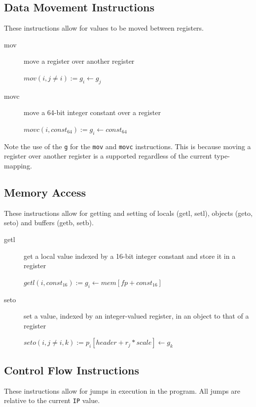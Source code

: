 \documentclass[english,a4paper,12pt]{report}
\begin{document}
\subsection{Data Movement Instructions}
These instructions allow for values to be moved between registers.

\begin{description}
	\item[mov] move a register over another register
	
	$mov(i, j \neq i) := g_{i} \longleftarrow g_{j} $ \\
	\item[movc] move a 64-bit integer constant over a register
	
	$movc(i, const_{64}):= g_{i} \longleftarrow const_{64} $ \\
\end{description}

Note the use of the \verb|g| for the \verb|mov| and \verb|movc|
instructions. This is because moving a register over another register
is a supported regardless of the current type-mapping.

\subsection{Memory Access}
These instructions allow for getting and setting of locals (getl,
setl), objects (geto, seto) and buffers (getb, setb).

\begin{description}
	\item[getl] get a local value indexed by a 16-bit integer 
	constant and store it in a register
	
	$getl(i, const_{16}):= g_{i} \longleftarrow mem[fp + const_{16}]$ 
	\\
	\item[seto] set a value, indexed by an integer-valued register, 
	in an
	object to that of a register
	
	$seto(i, j \neq i, k):= p_{i}[header + r_{j}*scale] 
	\longleftarrow g_{k}$ \\
	
	
\end{description}


\subsection{Control Flow Instructions}

These instructions allow for jumps in execution in the program. All
jumps are relative to the current \verb|IP| value.
\end{document}
